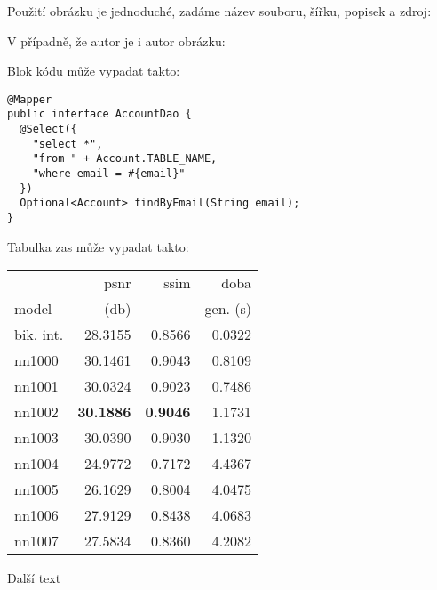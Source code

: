 			Použití obrázku je jednoduché, zadáme název souboru, šířku, popisek a zdroj:


			V případně, že autor je i autor obrázku:


			Blok kódu může vypadat takto:

			\begin{codeblock}
				\begin{verbatim}
@Mapper
public interface AccountDao {
  @Select({
    "select *",
    "from " + Account.TABLE_NAME,
    "where email = #{email}"
  })
  Optional<Account> findByEmail(String email);
}
				\end{verbatim}
			\end{codeblock}

			Tabulka zas může vypadat takto:

			\begin{table}[hbt!]
				\centering
				\begin{tabular}{| l | r | r | r | }
					\hline
					&        psnr &      ssim &      doba  \\
					model &       (db)    &           & gen. (s) \\
					\hline
					bik. int. & 28.3155 & 0.8566 & 0.0322 \\
					nn1000    & 30.1461 & 0.9043 & 0.8109 \\
					nn1001    & 30.0324 & 0.9023 & 0.7486 \\
					nn1002    & \textbf{30.1886} & \textbf{0.9046} & 1.1731 \\
					nn1003    & 30.0390 & 0.9030 & 1.1320 \\
					nn1004    & 24.9772 & 0.7172 & 4.4367 \\
					nn1005    & 26.1629 & 0.8004 & 4.0475 \\
					nn1006    & 27.9129 & 0.8438 & 4.0683 \\
					nn1007    & 27.5834 & 0.8360 & 4.2082 \\
					\hline
				\end{tabular}
			\end{table}

			\newpage

			Další text


